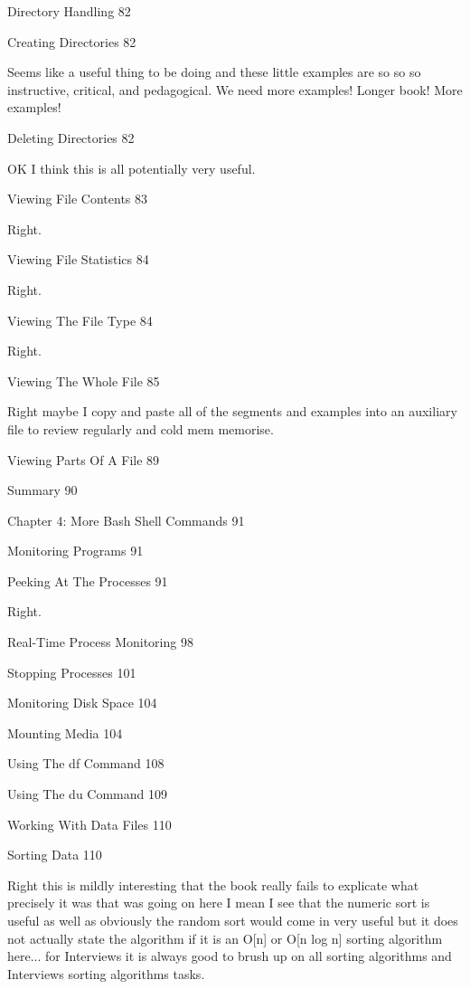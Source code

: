 Directory Handling 82



Creating Directories 82

Seems like a useful thing to be doing and these little examples are so so so instructive, critical, and pedagogical. We need more examples! Longer book! More examples!

Deleting Directories 82

OK I think this is all potentially very useful.

Viewing File Contents 83

Right.

Viewing File Statistics 84

Right.

Viewing The File Type 84

Right.

Viewing The Whole File 85

Right maybe I copy and paste all of the segments and examples into an auxiliary file to review regularly and cold mem memorise.

Viewing Parts Of A File 89



Summary 90



Chapter 4: More Bash Shell Commands 91



Monitoring Programs 91



Peeking At The Processes 91

Right.

Real-Time Process Monitoring 98



Stopping Processes 101



Monitoring Disk Space 104



Mounting Media 104



Using The df Command 108



Using The du Command 109



Working With Data Files 110



Sorting Data 110

Right this is mildly interesting that the book really fails to explicate what precisely it was that was going on here I mean I see that the numeric sort is useful as well as obviously the random sort would come in very useful but it does not actually state the algorithm if it is an O[n] or O[n log n] sorting algorithm here... for Interviews it is always good to brush up on all sorting algorithms and Interviews sorting algorithms tasks.

